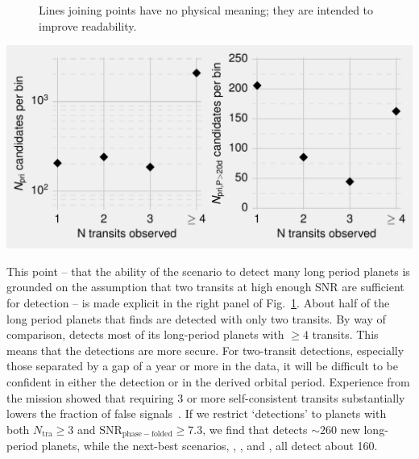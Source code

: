 \begin{enumerate}
\begin{figure}[!t]
{			Lines joining points have no physical meaning; they are 
			intended to improve readability.}
		\label{fig:Ntra_hist}
	\end{figure}
	\begin{marginfigure}[-1in]
		\centering
		\includegraphics[scale=1.]{figures/Ntra_histogram_primary.pdf}
		\caption{ 
			Similar to Fig.~\protect\ref{fig:Ntra_hist}, but for the Primary 
			Mission.
		}
		\label{fig:Ntra_hist_primary}
	\end{marginfigure}
	\vspace{-0.47cm}
	This point -- that the ability of the \hemis\:scenario to detect many long 
	period planets is grounded on the assumption that two transits at high 
	enough SNR are sufficient for detection -- is made explicit in the right 
	panel of Fig.~\ref{fig:Ntra_hist}.
	About half of the long period planets that \hemis\:finds are detected with only two transits.
	By way of comparison, \npole\:detects most of its long-period planets with $\ge 4$ transits.
	This means that the \npole\:detections are more secure.
	For two-transit detections, especially those separated by a gap of a year or more in the \tess data, it will be
        difficult to be confident in either the detection or in the derived 
        orbital period.
    Experience from the \kepler mission showed that requiring 3 or more 
    self-consistent transits substantially lowers the fraction of false 
    signals~\citep{burke_Q1Q8_2014}.
	If we restrict `detections' to planets with both $N_\mathrm{tra}\geq 3$ and 
	$\mathrm{SNR_{phase-folded} \geq 7.3}$, we find that \npole\:detects 
	$\sim\!260$ new long-period planets, while the next-best scenarios, \hemis,
	\nhemi, and \shemiAvoid, all detect about 160.
	
	


\end{enumerate}
